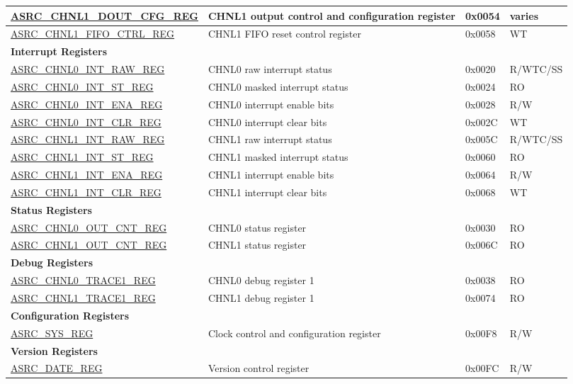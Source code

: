 \begin{longtable}{ | p{5.4cm} | p{7.3cm} | p{1.3cm} | p{1.5cm} | }
\hyperref[regdesc:ASRCCHNL1DOUTCFGREG]{ASRC\_CHNL1\_DOUT\_CFG\_REG} & CHNL1 output control and configuration register & 0x0054 & varies \\ \hline
\hyperref[regdesc:ASRCCHNL1FIFOCTRLREG]{ASRC\_CHNL1\_FIFO\_CTRL\_REG} & CHNL1 FIFO reset control register & 0x0058 & WT \\ \hline
\multicolumn{4}{|l|}{\textbf{Interrupt Registers}} \\ \hline
\hyperref[regdesc:ASRCCHNL0INTRAWREG]{ASRC\_CHNL0\_INT\_RAW\_REG} & CHNL0 raw interrupt status & 0x0020 & R/WTC/SS \\ \hline
\hyperref[regdesc:ASRCCHNL0INTSTREG]{ASRC\_CHNL0\_INT\_ST\_REG} & CHNL0 masked interrupt status & 0x0024 & RO \\ \hline
\hyperref[regdesc:ASRCCHNL0INTENAREG]{ASRC\_CHNL0\_INT\_ENA\_REG} & CHNL0 interrupt enable bits & 0x0028 & R/W \\ \hline
\hyperref[regdesc:ASRCCHNL0INTCLRREG]{ASRC\_CHNL0\_INT\_CLR\_REG} & CHNL0 interrupt clear bits & 0x002C & WT \\ \hline
\hyperref[regdesc:ASRCCHNL1INTRAWREG]{ASRC\_CHNL1\_INT\_RAW\_REG} & CHNL1 raw interrupt status & 0x005C & R/WTC/SS \\ \hline
\hyperref[regdesc:ASRCCHNL1INTSTREG]{ASRC\_CHNL1\_INT\_ST\_REG} & CHNL1 masked interrupt status & 0x0060 & RO \\ \hline
\hyperref[regdesc:ASRCCHNL1INTENAREG]{ASRC\_CHNL1\_INT\_ENA\_REG} & CHNL1 interrupt enable bits & 0x0064 & R/W \\ \hline
\hyperref[regdesc:ASRCCHNL1INTCLRREG]{ASRC\_CHNL1\_INT\_CLR\_REG} & CHNL1 interrupt clear bits & 0x0068 & WT \\ \hline
\multicolumn{4}{|l|}{\textbf{Status Registers}} \\ \hline
\hyperref[regdesc:ASRCCHNL0OUTCNTREG]{ASRC\_CHNL0\_OUT\_CNT\_REG} & CHNL0 status register & 0x0030 & RO \\ \hline
\hyperref[regdesc:ASRCCHNL1OUTCNTREG]{ASRC\_CHNL1\_OUT\_CNT\_REG} & CHNL1 status register & 0x006C & RO \\ \hline
\multicolumn{4}{|l|}{\textbf{Debug Registers}} \\ \hline
\hyperref[regdesc:ASRCCHNL0TRACE1REG]{ASRC\_CHNL0\_TRACE1\_REG} & CHNL0 debug register 1 & 0x0038 & RO \\ \hline
\hyperref[regdesc:ASRCCHNL1TRACE1REG]{ASRC\_CHNL1\_TRACE1\_REG} & CHNL1 debug register 1 & 0x0074 & RO \\ \hline
\multicolumn{4}{|l|}{\textbf{Configuration Registers}} \\ \hline
\hyperref[regdesc:ASRCSYSREG]{ASRC\_SYS\_REG} & Clock control and configuration register & 0x00F8 & R/W \\ \hline
\multicolumn{4}{|l|}{\textbf{Version Registers}} \\ \hline
\hyperref[regdesc:ASRCDATEREG]{ASRC\_DATE\_REG} & Version control register & 0x00FC & R/W \\ \hline
\end{longtable}
